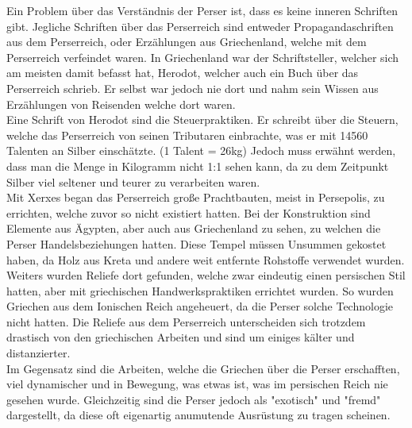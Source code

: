 \documentclass{article}
\begin{document}
	Ein Problem über das Verständnis der Perser ist, dass es keine inneren Schriften gibt. Jegliche Schriften über das Perserreich sind entweder Propagandaschriften aus dem Perserreich, oder Erzählungen aus Griechenland, welche mit dem Perserreich verfeindet waren. In Griechenland war der Schriftsteller, welcher sich am meisten damit befasst hat, Herodot, welcher auch ein Buch über das Perserreich schrieb. Er selbst war jedoch nie dort und nahm sein Wissen aus Erzählungen von Reisenden welche dort waren. \\
	Eine Schrift von Herodot sind die Steuerpraktiken. Er schreibt über die Steuern, welche das Perserreich von seinen Tributaren einbrachte, was er mit 14560 Talenten an Silber einschätzte. (1 Talent = 26kg) Jedoch muss erwähnt werden, dass man  die Menge in Kilogramm nicht 1:1 sehen kann, da zu dem Zeitpunkt Silber viel seltener und teurer zu verarbeiten waren. \\
	Mit Xerxes began das Perserreich große Prachtbauten, meist in Persepolis, zu errichten, welche zuvor so nicht existiert hatten. Bei der Konstruktion sind Elemente aus Ägypten, aber auch aus Griechenland zu sehen, zu welchen die Perser Handelsbeziehungen hatten. Diese Tempel müssen Unsummen gekostet haben, da Holz aus Kreta und andere weit entfernte Rohstoffe verwendet wurden. \\
	Weiters wurden Reliefe dort gefunden, welche zwar eindeutig einen persischen Stil hatten, aber mit griechischen Handwerkspraktiken errichtet wurden. So wurden Griechen aus dem Ionischen Reich angeheuert, da die Perser solche Technologie nicht hatten. Die Reliefe aus dem Perserreich unterscheiden sich trotzdem drastisch von den griechischen Arbeiten und sind um einiges kälter und distanzierter. \\
	Im Gegensatz sind die Arbeiten, welche die Griechen über die Perser erschafften, viel dynamischer und in Bewegung, was etwas ist, was im persischen Reich nie gesehen wurde. Gleichzeitig sind die Perser jedoch als "exotisch" und "fremd" dargestellt, da diese oft eigenartig anumutende Ausrüstung zu tragen scheinen. \\
\end{document}
